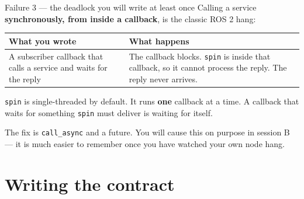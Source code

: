 \documentclass[aspectratio=169]{beamer}
\begin{document}
\begin{frame}{Failure 3 --- the deadlock you will write at least once}
  \small
  Calling a service \textbf{synchronously, from inside a callback}, is the classic ROS 2 hang:

  \vspace{0.5em}
  \begin{center}
  \begin{tabular}{@{}p{5.2cm}p{5.8cm}@{}}
    \toprule
    \textbf{What you wrote} & \textbf{What happens} \\
    \midrule
    A subscriber callback that calls a service and waits for the reply
      & The callback blocks. \texttt{spin} is inside that callback, so it cannot process
        the reply. The reply never arrives. \\
    \bottomrule
  \end{tabular}
  \end{center}

  \vspace{0.7em}
  \begin{underhood}[Why]
    \footnotesize
    \texttt{spin} is single-threaded by default. It runs \textbf{one} callback at a time. A
    callback that waits for something \texttt{spin} must deliver is waiting for itself.
  \end{underhood}

  \vspace{0.4em}
  \footnotesize
  The fix is \texttt{call\_async} and a future. You will cause this on purpose in session B ---
  it is much easier to remember once you have watched your own node hang.
\end{frame}

\section{Writing the contract}
\end{document}
